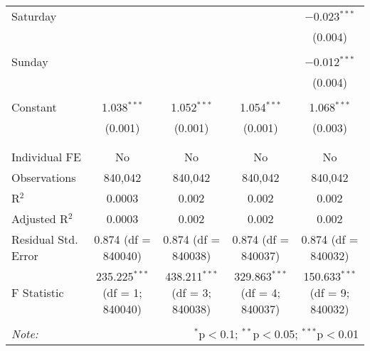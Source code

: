 \documentclass[
]{article}
\begin{document}
\begin{table}[!htbp]
{\begin{tabular}{@{\extracolsep{5pt}}lcccc}
 Saturday &  &  &  & $-$0.023$^{***}$ \\ 
  &  &  &  & (0.004) \\ 
  & & & & \\ 
 Sunday &  &  &  & $-$0.012$^{***}$ \\ 
  &  &  &  & (0.004) \\ 
  & & & & \\ 
 Constant & 1.038$^{***}$ & 1.052$^{***}$ & 1.054$^{***}$ & 1.068$^{***}$ \\ 
  & (0.001) & (0.001) & (0.001) & (0.003) \\ 
  & & & & \\ 
\hline \\[-1.8ex] 
Individual FE & No & No & No & No \\ 
Observations & 840,042 & 840,042 & 840,042 & 840,042 \\ 
R$^{2}$ & 0.0003 & 0.002 & 0.002 & 0.002 \\ 
Adjusted R$^{2}$ & 0.0003 & 0.002 & 0.002 & 0.002 \\ 
Residual Std. Error & 0.874 (df = 840040) & 0.874 (df = 840038) & 0.874 (df = 840037) & 0.874 (df = 840032) \\ 
F Statistic & 235.225$^{***}$ (df = 1; 840040) & 438.211$^{***}$ (df = 3; 840038) & 329.863$^{***}$ (df = 4; 840037) & 150.633$^{***}$ (df = 9; 840032) \\ 
\hline 
\hline \\[-1.8ex] 
\textit{Note:}  & \multicolumn{4}{r}{$^{*}$p$<$0.1; $^{**}$p$<$0.05; $^{***}$p$<$0.01} \\ 
\end{tabular}
} 
\end{table} 
\newpage
\end{document}
